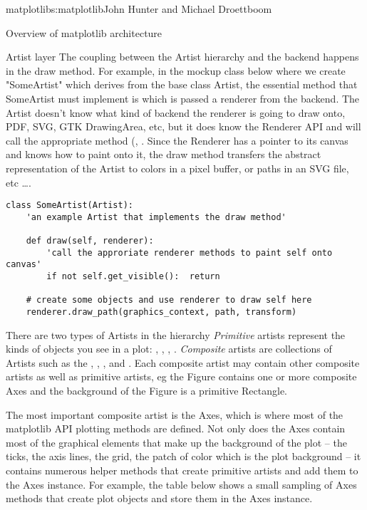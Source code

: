 \begin{aosachapter}{matplotlib}{s:matplotlib}{John Hunter and Michael Droettboom}
\begin{aosasect1}{Overview of matplotlib architecture}
\begin{aosasect2}{Artist layer}
The coupling between the Artist hierarchy and the backend happens in
the draw method.  For example, in the mockup class below where we
create "SomeArtist" which derives from the base class Artist, the
essential method that SomeArtist must implement is  which
is passed a renderer from the backend.  The Artist doesn't know what
kind of backend the renderer is going to draw onto, PDF, SVG, GTK
DrawingArea, etc, but it does know the Renderer API and will call the
appropriate method (, .  Since the
Renderer has a pointer to its canvas and knows how to paint onto it,
the draw method transfers the abstract representation of the Artist to
colors in a pixel buffer, or paths in an SVG file, etc \dots{}.

\begin{verbatim}
class SomeArtist(Artist):
    'an example Artist that implements the draw method'

    def draw(self, renderer):
        'call the approriate renderer methods to paint self onto canvas'
        if not self.get_visible():  return

	# create some objects and use renderer to draw self here
	renderer.draw_path(graphics_context, path, transform)

\end{verbatim}

There are two types of Artists in the hierarchy \emph{Primitive}
artists represent the kinds of objects you see in a plot:
, , , .
\emph{Composite} artists are collections of Artists such as the
, , , and .  Each
composite artist may contain other composite artists as well as
primitive artists, eg the Figure contains one or more composite Axes
and the background of the Figure is a primitive Rectangle.

The most important composite artist is the Axes, which is where most
of the matplotlib API plotting methods are defined.  Not only does the
Axes contain most of the graphical elements that make up the
background of the plot -- the ticks, the axis lines, the grid, the
patch of color which is the plot background -- it contains numerous
helper methods that create primitive artists and add them to the Axes
instance.  For example, the table below shows a small sampling of Axes
methods that create plot objects and store them in the Axes instance.


\end{aosasect2}
\end{aosasect1}
\end{aosachapter}
